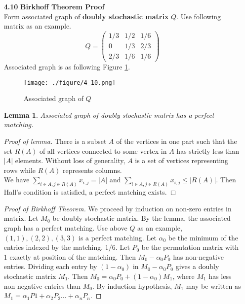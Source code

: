 \documentclass[12pt]{article}
\begin{document}
\begin{enumerate}
\begin{proof}
\end{proof}
\item[\textbf{4.10}]\textbf{Birkhoff Theorem Proof} \\
Form associated graph of \textbf{doubly stochastic matrix} $Q$. Use following matrix as an example. 
\begin{equation*}
Q =
\begin{pmatrix}
1/3 & 1/2 & 1/6 \\
0   & 1/3 & 2/3 \\
2/3 & 1/6 & 1/6
\end{pmatrix}
\end{equation*}
Associated graph is as following Figure \ref{10}. 
\begin{figure}[htp!]
	\centering
	\texttt{[image: ./figure/4\_10.png]}
	\caption{Associated graph of $Q$}
	\label{10}
\end{figure} 
\newtheorem{lemma}{Lemma} 
\begin{lemma}
Associated graph of doubly stochastic matrix has a perfect matching.
\end{lemma}
\begin{proof}[Proof of lemma]
There is a subset $A$ of the vertices in one part such that the set $R(A)$ of all vertices connected to some vertex in $A$ has strictly less than $|A|$ elements. Without loss of generality, $A$ is a set of vertices representing rows while $R(A)$ represents columns. \\
We have $\sum_{i\in A, j\in R(A)} x_{i,j} = |A|$
and $\sum_{i\in A, j\in R(A)} x_{i,j} \leq |R(A)|$. 
Then Hall's condition is satisfied, a perfect matching exists. 
\end{proof}
\begin{proof}[Proof of Birkhoff Theorem] 
We proceed by induction on non-zero entries in matrix. 
Let $M_0$ be doubly stochastic matrix. By the lemma, the associated graph has a perfect matching. Use above $Q$ as an example, $(1,1), (2,2),(3,3)$ is a perfect matching.
Let $\alpha_0$ be the minimum of the entries indexed by the matching, $1/6$. 
Let $P_0$ be the permutation matrix with 1 exactly at position of the matching. 
Then $M_0-\alpha_0 P_0$ has non-negative entries. Dividing each entry by $(1-\alpha_0)$ in $M_0-\alpha_0 P_0$ gives a doubly stochastic matrix $M_1$.
Then $M_0 = \alpha_0 P_0 + (1 - \alpha_0) M_1$, where $M_1$ has less non-negative entries than $M_0$.
By induction hypothesis, $M_1$ may be written as $M_1 = \alpha_1 P1 + \alpha_2 P_2 \dots + \alpha_n P_n$. 

\end{proof}
\end{enumerate}
\end{document}
